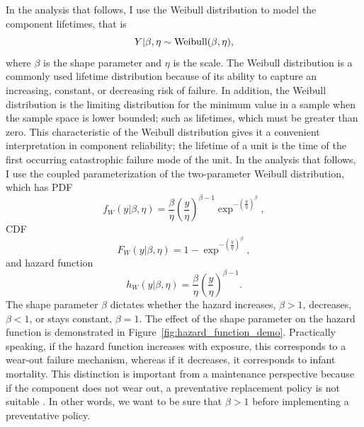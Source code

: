 In the analysis that follows, I use the Weibull distribution to model the component lifetimes, that is
\begin{equation}
    Y|\beta, \eta \sim \hbox{Weibull}(\beta, \eta),
\end{equation}
where $\beta$ is the shape parameter and $\eta$ is the scale. The Weibull distribution is a commonly used lifetime distribution because of its ability to capture an increasing, constant, or decreasing risk of failure. In addition, the Weibull distribution is the limiting distribution for the minimum value in a sample when the sample space is lower bounded; such as lifetimes, which must be greater than zero. This characteristic of the Weibull distribution gives it a convenient interpretation in component reliability; the lifetime of a unit is the time of the first occurring catastrophic failure mode of the unit. In the analysis that follows, I use the coupled parameterization of the two-parameter Weibull distribution, which has PDF
\begin{equation}
    f_{W}(y|\beta, \eta) = \frac{\beta}{\eta}\left(\frac{y}{\eta}\right)^{\beta - 1} \exp^{-\left(\frac{y}{\eta}\right)^{\beta}},
\end{equation}
CDF
\begin{equation}
    F_{W}(y|\beta, \eta) = 1 - \exp^{-\left(\frac{y}{\eta}\right)^{\beta}},
\end{equation}
and hazard function
\begin{equation}
    h_{W}(y|\beta, \eta) = \frac{\beta}{\eta}\left(\frac{y}{\eta}\right)^{\beta - 1}.
\end{equation}
The shape parameter $\beta$ dictates whether the hazard increases, $\beta > 1$, decreases, $\beta < 1$, or stays constant, $\beta = 1$. The effect of the shape parameter on the hazard function is demonstrated in Figure~\ref{fig:hazard_function_demo}. Practically speaking, if the hazard function increases with exposure, this corresponds to a wear-out failure mechanism, whereas if it decreases, it corresponds to infant mortality. This distinction is important from a maintenance perspective because if the component does not wear out, a preventative replacement policy is not suitable \citep{jardine2013}. In other words, we want to be sure that $\beta > 1$ before implementing a preventative policy.

